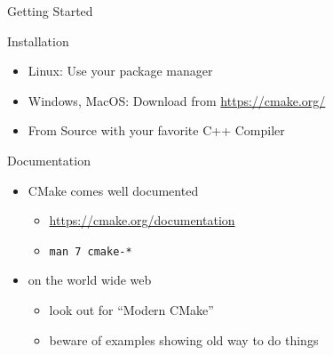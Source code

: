 \documentclass[t]{beamer}
\begin{document}
\begin{frame}{Getting Started}
    \begin{block}{Installation}
        \begin{itemize}
            \item Linux: Use your package manager
            \item Windows, MacOS: Download from \url{https://cmake.org/}
            \item From Source with your favorite C++ Compiler
        \end{itemize}
    \end{block}
    \pause
    \begin{block}{Documentation}
        \begin{itemize}
            \item CMake comes well documented
                \begin{itemize}
                    \item \url{https://cmake.org/documentation}
                    \item \texttt{man 7 cmake-*}
                \end{itemize}
            \item on the world wide web
                \begin{itemize}
                    \item look out for \enquote{Modern CMake}
                    \item beware of examples showing old way to do things
                \end{itemize}
        \end{itemize}
    \end{block}
\end{frame}
\end{document}
